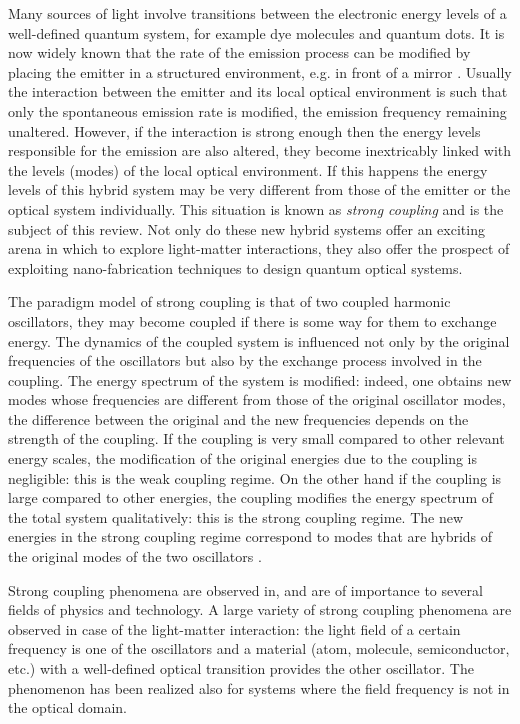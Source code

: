 \documentclass[12pt]{iopart}
\begin{document}
Many sources of light involve transitions between the electronic energy levels of a well-defined quantum system, for example dye molecules and quantum dots. It is now widely known that the rate of the emission process can be modified by placing the emitter in a structured environment, e.g. in front of a mirror \cite{Drexhage_ProgOpt_1974_12_163}. Usually the interaction between the emitter and its local optical environment is such that only the spontaneous emission rate is modified, the emission frequency remaining unaltered. However, if the interaction is strong enough then the energy levels responsible for the emission are also altered, they become inextricably linked with the levels (modes) of the local optical environment. If this happens the energy levels of this hybrid system may be very different from those of the emitter or the optical system individually. This situation is known as {\it strong coupling} and is the subject of this review. Not only do these new hybrid systems offer an exciting arena in which to explore light-matter interactions, they also offer the prospect of exploiting nano-fabrication techniques to design quantum optical systems. 

The paradigm model of strong coupling is that of two coupled harmonic oscillators, they may become coupled if there is some way for them to exchange energy. The dynamics of the coupled system is influenced not only by the original frequencies of the oscillators but also by the exchange process involved in the coupling. The energy spectrum of the system is modified: indeed, one obtains new modes whose frequencies are different from those of the original oscillator modes, the difference between the original and the new frequencies depends on the strength of the coupling. If the coupling is very small compared to other relevant energy scales, the modification of the original energies due to the coupling is negligible: this is the weak coupling regime. On the other hand if the coupling is large compared to other energies, the coupling modifies the energy spectrum of the total system qualitatively: this is the strong coupling regime. The new energies in the strong coupling regime correspond to modes that are hybrids of the original modes of the two oscillators \cite{Haroche_1992_CQED}. 

Strong coupling phenomena are observed in, and are of importance to several fields of physics and technology. A large variety of strong coupling phenomena are observed in case of the light-matter interaction: the light field of a certain frequency is one of the oscillators and a material (atom, molecule, semiconductor, etc.) with a well-defined optical transition provides the other oscillator. The phenomenon has been realized also for systems where the field frequency is not in the optical domain. 
\end{document}
